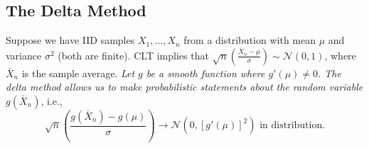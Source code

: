     \subsection{The Delta Method}
        Suppose we have IID samples $X_1, \ldots, X_n$ from a distribution with mean $\mu$ and variance $\sigma^2$ (both are finite).
        CLT implies that $\sqrt{n}\left( \frac{ \bar{X}_n - \mu }{\sigma} \right) \sim \mathcal{N}(0, 1)$, where $\bar{X}_n$ is the sample average. 
        \emph{Let $g$ be a smooth function where $g'(\mu) \ne 0$.
        The delta method allows us to make probabilistic statements about the random variable $g(\bar{X}_n)$}, i.e., 
        \begin{equation}
            \sqrt{n}\left( \frac{ g(\bar{X}_n) - g(\mu) }{\sigma} \right) \rightarrow \mathcal{N}(0, [g'(\mu)]^2) \text{ in distribution}.
        \end{equation}

